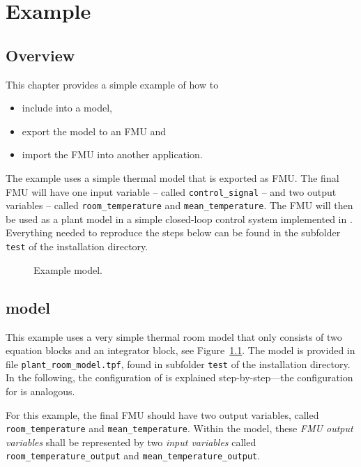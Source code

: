 \chapter{Example}

\section{Overview}

This chapter provides a simple example of how to
\begin{itemize}
  \item include \type into a \trnsys model,
  \item export the model to an FMU and
  \item import the FMU into another application.
\end{itemize}

The example uses a simple thermal model that is exported as FMU.
The final FMU will have one input variable -- called \verb!control_signal! -- and two output variables -- called \verb!room_temperature! and \verb!mean_temperature!.
The FMU will then be used as a plant model in a simple closed-loop control system implemented in \href{https://en.wikipedia.org/wiki/Dymola}{\dymola}.
Everything needed to reproduce the steps below can be found in the subfolder \texttt{test} of the installation directory.

\begin{figure}[h!]
\caption{Example \trnsys model.}
\label{fig:trnsys_model_example}
\end{figure}


\section{\trnsys model}

This example uses a very simple thermal room model that only consists of two equation blocks and an integrator block, see Figure~\ref{fig:trnsys_model_example}.
The model is provided in file \verb!plant_room_model.tpf!, found in subfolder \verb!test! of the installation directory.
In the following, the configuration of \typeb is explained step-by-step---the configuration for \typea is analogous.

For this example, the final FMU should have two output variables, called \texttt{room\_temperature} and \texttt{mean\_temperature}.
Within the \trnsys model, these \emph{FMU output variables} shall be represented by two \emph{\typeb input variables} called \texttt{room\_temperature\_output} and \texttt{mean\_temperature\_output}.

